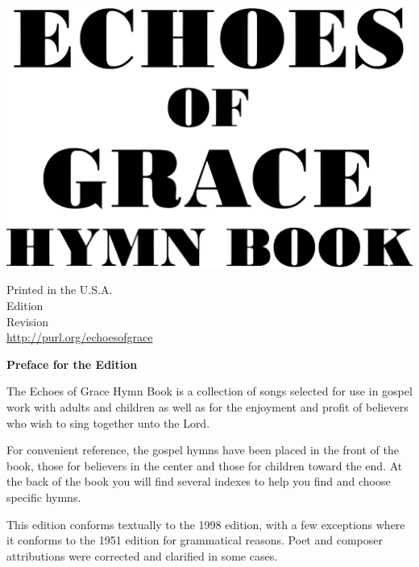 \documentclass{book}
\begin{document}

\vspace*{1in}

\noindent\hfil\includegraphics[scale=0.06]{booklayout/bodoni-scan}\hfil

\vfill



\pagebreak

\vspace*{\fill}
\begin{center}
Printed in the U.S.A.\\
\the\year{} Edition\\
Revision \\
\url{http://purl.org/echoesofgrace}
\end{center}

\pagebreak


\vspace*{1.5in}
\noindent\hfil{\textbf{Preface for the \the\year{} Edition}}\hfil

The {\textit{}Echoes of Grace Hymn Book} is a collection of songs selected for
use in gospel work with adults and children as well as for the enjoyment and
profit of believers who wish to sing together unto the Lord.

For convenient reference, the gospel hymns have been placed in the front of the
book, those for believers in the center and those for children toward the end.
At the back of the book you will find several indexes to help you find and
choose specific hymns.

This edition conforms textually to the 1998 edition, with a few exceptions
where it conforms to the 1951 edition for grammatical reasons. Poet and
composer attributions were corrected and clarified in some cases.
\end{document}

